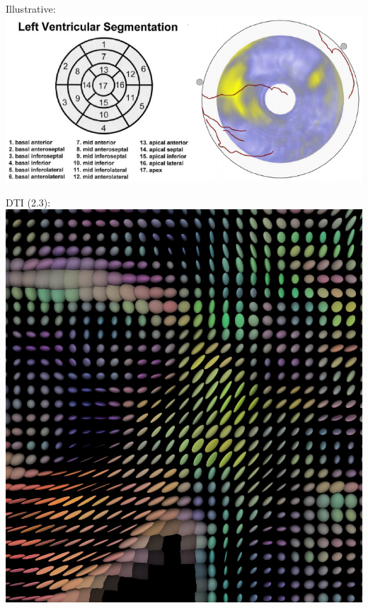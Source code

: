 \documentclass{beamer}
\begin{document}
\begin{frame}
	Illustrative:
	\includegraphics[width=\textwidth]{images/heart}
\end{frame}

\begin{frame}
	DTI (2.3):
	\includegraphics[width=\textwidth]{images/dti}
\end{frame}
\end{document}
